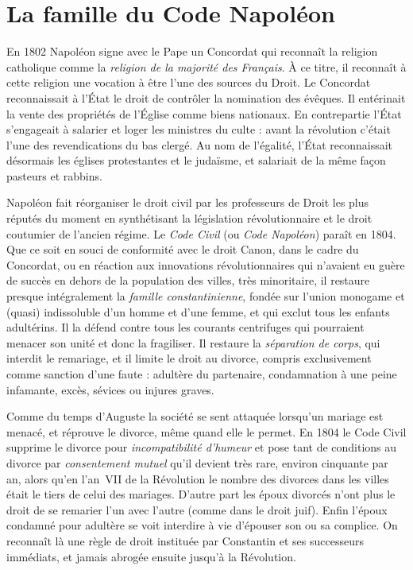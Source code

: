 


\chapter{La famille du Code Napoléon}


 En 1802 Napoléon signe avec le Pape un Concordat qui reconnaît la religion catholique comme la \emph{religion de la majorité des Français}. À ce titre, il reconnaît à cette religion une vocation à être l'une des sources du Droit. Le Concordat reconnaissait à l'État le droit de contrôler la nomination des évêques. Il entérinait la vente des propriétés de l'Église comme biens nationaux. En contrepartie l'État s'engageait à salarier et loger les ministres du culte : avant la révolution c'était l'une des revendications du bas clergé. Au nom de l'égalité, l'État reconnaissait désormais les églises protestantes et le judaïsme, et salariait de la même façon pasteurs et rabbins.
 
 Napoléon fait réorganiser le droit civil par les professeurs de Droit les plus réputés du moment en synthétisant la législation révolutionnaire et le droit coutumier de l'ancien régime.  Le \emph{Code Civil} (ou \emph{Code Napoléon}) paraît en 1804. Que ce soit en souci de conformité avec le droit Canon, dans le cadre du Concordat, ou en réaction aux innovations révolutionnaires  qui n'avaient eu guère de succès en dehors de la population des villes, très minoritaire, il restaure presque intégralement la \emph{famille constantinienne}, fondée sur l'union monogame et (quasi) indissoluble d'un homme et d'une femme, et qui exclut tous les enfants adultérins. Il la défend contre tous les courants centrifuges qui pourraient menacer son unité et donc la fragiliser. Il restaure la \emph{séparation de corps}, qui interdit le remariage, et il limite le droit au divorce, compris exclusivement comme sanction d'une faute : adultère du partenaire, condamnation à une peine infamante, excès, sévices ou injures graves. 

 Comme du temps d'Auguste la société se sent attaquée lorsqu'un mariage est menacé, et réprouve le divorce, même quand elle le permet. En 1804 le Code Civil supprime le divorce pour \emph{incompatibilité d'humeur} et pose tant de conditions au divorce par \emph{consentement mutuel} qu'il devient très rare, environ cinquante par an, alors qu'en l'an~VII de la Révolution le nombre des divorces dans les villes était le tiers de celui des mariages. D'autre part les époux divorcés n'ont plus le droit de se remarier l'un avec l'autre (comme dans le droit juif). Enfin l'époux condamné pour adultère se voit interdire à vie d'épouser son ou sa complice. On reconnaît là une règle de droit instituée par Constantin et ses successeurs immédiats, et jamais abrogée ensuite jusqu'à la Révolution.

